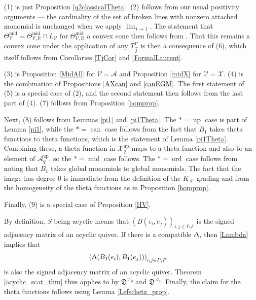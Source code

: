 \documentclass{amsart}
\DeclareMathOperator{\up}{up}
\DeclareMathOperator{\midd}{mid}
\DeclareMathOperator{\ord}{ord}
\DeclareMathOperator{\can}{can}
\let\bb=\mathbb
\let\rar=\rightarrow
\let\f=\mathfrak
\let\s=\mathcal
\newcommand {\jj} {\vec{\jmath}}
\renewcommand{\Lambda}{\Uplambda}
\theoremstyle{plain}%
\theoremstyle{definition}
\theoremstyle{remark}
\newenvironment{myproof}[1][\proofname]{\proof[#1]\mbox{}}{\endproof}
\begin{document}
\begin{myproof}[Proof of Theorem \ref{MainThm2}]

(1) is just Proposition \ref{q2classicalTheta}.  (2) follows from our usual positivity arguments --- the cardinality of the set of broken lines with nonzero attached monomial is unchanged when we apply $\lim_{t\rar 1}$.  The statement that $\Theta_{\s{V}}^{\midd}=\Theta^{\midd}_{\s{V},\bb{R}}\cap L_{\s{V}}$ for $\Theta^{\midd}_{\s{V},\bb{R}}$ a convex cone then follows from \cite[Thm. 0.3(4)]{GHKK}.  That this remains a convex cone 
under the application of any $T_{\jj}^{\s{V}}$ is then a consequence of (6), which itself follows from Corollaries \ref{TjCor} and \ref{FormalLaurent}.


(3) is Proposition \ref{MidAll} for $\s{V}=\s{A}$ and Proposition \ref{midX} for $\s{V}=\s{X}$.  (4) is the combination of Propositions \ref{AXcan} and \ref{canEGM}.  The first statement of (5) is a special case of (2), and the second statement then follows from the last part of (4).  (7) follows from Proposition \ref{homprop}.

Next, (8) follows from Lemmas  \ref{pi1} and \ref{pi1Theta}.  The $*=\up$ case is part of Lemma \ref{pi1}, while the $*=\can$ case follows from the fact that $B_1$ takes theta functions to theta functions, which is the statement of Lemma \ref{pi1Theta}.  Combining these, a theta function in $\s{X}_q^{\up}$ maps to a theta function and also to an element of $\s{A}_q^{\up}$, so the $*=\midd$ case follows.  The $*=\ord$ case follows from noting that $B_1$ takes global monomials to global monomials.  The fact that the image has degree $0$ is immediate from the definition of the $K_{\s{A}}$--grading and from the homogeneity of the theta functions as in Proposition \ref{homprop}.

Finally, (9) is a special case of Proposition \ref{HV}.
\end{myproof}


\begin{myproof}[Proof of Theorem \ref{AcyclicLefschetz}]
By definition, $S$ being acyclic means that $(B(e_i,e_j))_{i,j\in I\setminus F}$ is the signed adjacency matrix of an acyclic quiver.  If there is a compatible $\Lambda$, then \eqref{Lambda} implies that $$\left(\Lambda(B_1(e_i),B_1(e_j))\right)_{i,j\in I\setminus F}$$ is also the signed adjacency matrix of an acyclic quiver.   Theorem \ref{acyclic_scat_thm} thus applies to by $\f{D}^{\s{X}_q}$ and $\f{D}^{\s{A}_q}$.  Finally, the claim for the theta functions follows using Lemma \ref{Lefschetz_prop}.
\end{myproof}
\end{document}
